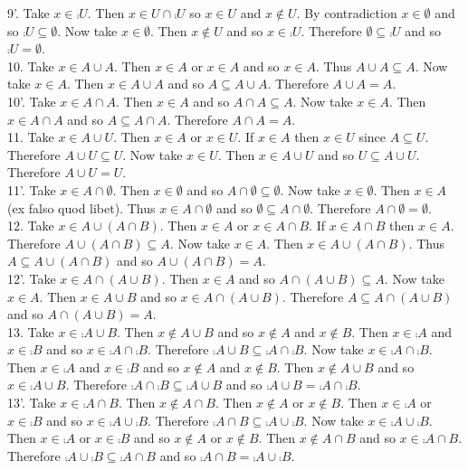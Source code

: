 \documentclass[12pt]{book}
\begin{document}
9'. Take $x \in \comp{U}$. Then $x \in U \cap \comp{U}$ so $x \in U$ and $x \notin U$. By contradiction $x \in \emptyset$ and so $\comp{U} \subseteq \emptyset$. Now take $x \in \emptyset$. Then $x \notin U$ and so $x \in \comp{U}$. Therefore $\emptyset \subseteq \comp{U}$ and so $\comp{U} = \emptyset$.\\
10. Take $x \in A \cup A$. Then $x \in A$ or $x \in A$ and so $x \in A$. Thus $A \cup A \subseteq A$. Now take $x \in A$. Then $x \in A \cup A$ and so $A \subseteq A \cup A$. Therefore $A \cup A = A$.\\
10'. Take $x \in A \cap A$. Then $x \in A$ and so $A \cap A \subseteq A$. Now take $x \in A$. Then $x \in A \cap A$ and so $A \subseteq A \cap A$. Therefore $A \cap A = A$.\\
11. Take $x \in A \cup U$. Then $x \in A$ or $x \in U$. If $x \in A$ then $x \in U$ since $A \subseteq U$. Therefore $A \cup U \subseteq U$. Now take $x \in U$. Then $x \in A \cup U$ and so $U \subseteq A \cup U$. Therefore $A \cup U = U$.\\
11'. Take $x \in A \cap \emptyset$. Then $x \in \emptyset$ and so $A \cap \emptyset \subseteq \emptyset$. Now take $x \in \emptyset$. Then $x \in A$ (ex falso quod libet). Thus $x \in A \cap \emptyset$ and so $\emptyset \subseteq A \cap \emptyset$. Therefore $A \cap \emptyset = \emptyset$.\\
12. Take $x \in A \cup (A \cap B)$. Then $x \in A$ or $x \in A \cap B$. If $x \in A \cap B$ then $x \in A$. Therefore $A \cup (A \cap B) \subseteq A$. Now take $x \in A$. Then $x \in A \cup (A \cap B)$. Thus $A \subseteq A \cup (A \cap B)$ and so $A \cup (A \cap B) = A$.\\
12'. Take $x \in A \cap (A \cup B)$. Then $x \in A$ and so $A \cap (A \cup B) \subseteq A$. Now take $x \in A$. Then $x \in A \cup B$ and so $x \in A \cap (A \cup B)$. Therefore $A \subseteq A \cap (A \cup B)$ and so $A \cap (A \cup B) = A$.\\
13. Take $x \in \comp{A \cup B}$. Then $x \notin A \cup B$ and so $x \notin A$ and $x \notin B$. Then $x \in \comp{A}$ and $x \in \comp{B}$ and so $x \in \comp{A} \cap \comp{B}$. Therefore $\comp{A \cup B} \subseteq \comp{A} \cap \comp{B}$. Now take $x \in \comp{A} \cap \comp{B}$. Then $x \in \comp{A}$ and $x \in \comp{B}$ and so $x \notin A$ and $x \notin B$. Then $x \notin A \cup B$ and so $x \in \comp{A \cup B}$. Therefore $\comp{A} \cap \comp{B} \subseteq \comp{A \cup B}$ and so $\comp{A \cup B} = \comp{A} \cap \comp{B}$.\\
13'. Take $x \in \comp{A \cap B}$. Then $x \notin A \cap B$. Then $x \notin A$ or $x \notin B$. Then $x \in \comp{A}$ or $x \in \comp{B}$ and so $x \in \comp{A} \cup \comp{B}$. Therefore $\comp{A \cap B} \subseteq \comp{A} \cup \comp{B}$. Now take $x \in \comp{A} \cup \comp{B}$. Then $x \in \comp{A}$ or $x \in \comp{B}$ and so $x \notin A$ or $x \notin B$. Then $x \notin A \cap B$ and so $x \in \comp{A \cap B}$. Therefore $\comp{A} \cup \comp{B} \subseteq \comp{A \cap B}$ and so $\comp{A \cap B} = \comp{A} \cup \comp{B}$.\\
\end{document}

